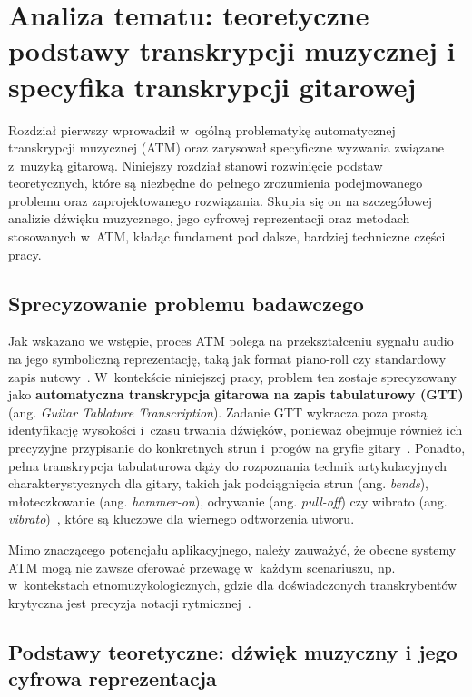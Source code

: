 \chapter[Analiza tematu: podstawy i specyfika transkrypcji gitarowej]{Analiza tematu: teoretyczne podstawy transkrypcji muzycznej i specyfika transkrypcji gitarowej}
\label{chap:analiza_tematu}

Rozdział pierwszy wprowadził w~ogólną problematykę automatycznej transkrypcji muzycznej (ATM) oraz zarysował specyficzne wyzwania związane z~muzyką gitarową. Niniejszy rozdział stanowi rozwinięcie podstaw teoretycznych, które są niezbędne do pełnego zrozumienia podejmowanego problemu oraz zaprojektowanego rozwiązania. Skupia się on na szczegółowej analizie dźwięku muzycznego, jego cyfrowej reprezentacji oraz metodach stosowanych w~ATM, kładąc fundament pod dalsze, bardziej techniczne części pracy.

\section{Sprecyzowanie problemu badawczego}
\label{sec:definicja_problemu_atm}

Jak wskazano we wstępie, proces ATM polega na przekształceniu sygnału audio na jego symboliczną reprezentację, taką jak format piano-roll czy standardowy zapis nutowy~\autocite{KlapuriDavy2006SignalProcessing,Benetos2019AutomaticMusicTranscription}. W~kontekście niniejszej pracy, problem ten zostaje sprecyzowany jako \textbf{automatyczna transkrypcja gitarowa na zapis tabulaturowy (GTT)} (ang. \textit{Guitar Tablature Transcription}). Zadanie GTT wykracza poza prostą identyfikację wysokości i~czasu trwania dźwięków, ponieważ obejmuje również ich precyzyjne przypisanie do konkretnych strun i~progów na gryfie gitary~\autocite{Wiggins2019TabCNN}. Ponadto, pełna transkrypcja tabulaturowa dąży do rozpoznania technik artykulacyjnych charakterystycznych dla gitary, takich jak podciągnięcia strun (ang. \textit{bends}), młoteczkowanie (ang. \textit{hammer-on}), odrywanie (ang. \textit{pull-off}) czy wibrato (ang. \textit{vibrato})~\autocite{Reboursiere2011GuitarController}, które są kluczowe dla wiernego odtworzenia utworu.

Mimo znaczącego potencjału aplikacyjnego, należy zauważyć, że obecne systemy ATM mogą nie zawsze oferować przewagę w~każdym scenariuszu, np. w~kontekstach etnomuzykologicznych, gdzie dla doświadczonych transkrybentów krytyczna jest precyzja notacji rytmicznej~\autocite{Holzapfel2019Ethnomusicology}.
\section{Podstawy teoretyczne: dźwięk muzyczny i jego cyfrowa reprezentacja}
\label{sec:podstawy_teoretyczne_dzwiek}

